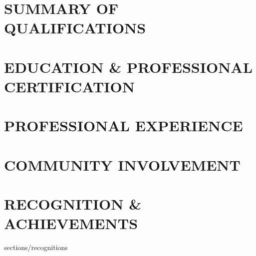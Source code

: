 \documentclass[letter,10pt]{article}
\begin{document}
\section {SUMMARY OF QUALIFICATIONS}


\section{EDUCATION \& PROFESSIONAL CERTIFICATION}


\section{PROFESSIONAL EXPERIENCE}


\section {COMMUNITY INVOLVEMENT}


\section {RECOGNITION \& ACHIEVEMENTS}
 {sections/recognitions}
\end{document}
